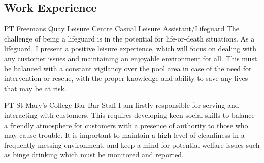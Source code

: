 \documentclass[10pt]{article} %
\begin{document}
\begin{paracol}{2}
\vspace{-\baselineskip}\medskip %


\section{Work Experience}





{PT} %
{Freemans Quay Leisure Centre} %
{Casual Leisure Assistant/Lifeguard} %
{The challenge of being a lifeguard is in the potential for life-or-death situations. As a lifeguard, I present a positive leisure experience, which will focus on dealing with any customer issues and maintaining an enjoyable environment for all. This must be balanced with a constant vigilancy over the pool area in case of the need for intervention or rescue, with the proper knowledge and ability to save any lives that may be at risk.} %


{PT} %
{St Mary's College Bar} %
{Bar Staff} %
{I am firstly responsible for serving and interacting with customers. This requires developing keen social skills to balance a friendly atmosphere for customers with a presence of authority to those who may cause trouble. It is important to maintain a high level of cleanliness in a frequently messing environment, and keep a mind for potential welfare issues such as binge drinking which must be monitored and reported.}  %



\end{paracol}
\end{document}
